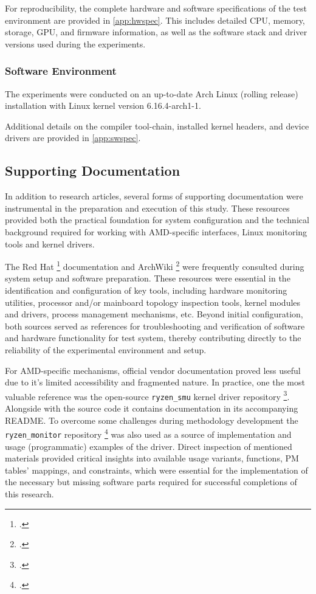 For reproducibility, the complete hardware and software specifications of the
test environment are provided in \cref{app:hwspec}. This includes detailed
\gls{CPU}, memory, storage, \gls{GPU}, and firmware information, as well as
the software stack and driver versions used during the experiments.

\subsubsection{Software Environment}

The experiments were conducted on an up-to-date Arch Linux (rolling release)
installation with Linux kernel version 6.16.4-arch1-1.

Additional details on the compiler tool-chain, installed kernel headers, and
device drivers are provided in \cref{app:swspec}.

\subsection{Supporting Documentation}

In addition to research articles, several forms of supporting
documentation were instrumental in the preparation and execution of
this study. These resources provided both the practical foundation for
system configuration and the technical background required for working
with AMD-specific interfaces, Linux monitoring tools and kernel drivers.

The Red Hat \footcite{RedHat_Docs} documentation and ArchWiki \footcite{ArchWiki}
were frequently consulted during system setup and software preparation. These
resources were essential in the identification and configuration of key tools,
including hardware monitoring utilities, processor and/or mainboard topology
inspection tools, kernel modules and drivers, process management mechanisms, etc.
Beyond initial configuration, both sources served as references for
troubleshooting and verification of software and hardware functionality for
test system, thereby contributing directly to the reliability of the
experimental environment and setup.

For AMD-specific mechanisms, official vendor documentation proved less
useful due to it's limited accessibility and fragmented nature. In practice,
one the most valuable reference was the open-source \texttt{ryzen\_smu} kernel
driver repository \footcite{RyzenSMU_GitHub}. Alongside with the source code
it contains documentation in its accompanying README. To overcome some
challenges during methodology development the \texttt{ryzen\_monitor} repository
\footcite{RyzenMonitor_GitHub} was also used as a source of implementation and
usage (programmatic) examples of the driver. Direct inspection of mentioned
materials provided critical insights into available usage variants, functions,
\gls{PM} tables' mappings, and constraints, which were essential for the
implementation of the necessary but missing software parts required for
successful completions of this research.

